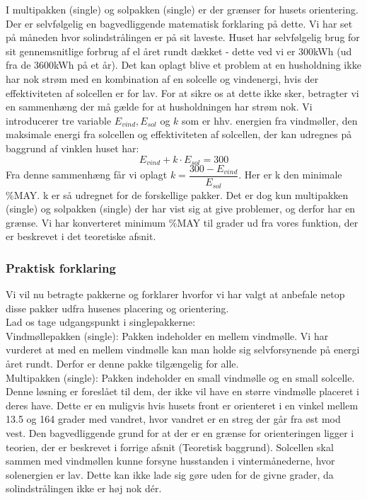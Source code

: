 \documentclass[12pt,a4paper]{article}
\theoremstyle{break}
\theoremstyle{nonumberplain}
\begin{document}
I multipakken (single) og solpakken (single) er der grænser for husets orientering. 
Der er selvfølgelig en bagvedliggende matematisk forklaring på dette. 
Vi har set på måneden hvor solindstrålingen er på sit laveste. Huset har selvfølgelig brug for sit gennemsnitlige forbrug af el året rundt dækket - dette ved vi er 300kWh (ud fra de 3600kWh på et år). 
Det kan oplagt blive et problem at en husholdning ikke har nok strøm med en kombination af en solcelle og vindenergi, hvis der effektiviteten af solcellen er for lav. 
For at sikre os at dette ikke sker, betragter vi en sammenhæng der må gælde for at husholdningen har strøm nok. Vi introducerer tre variable $E_{vind},E_{sol}$ og $k$ som er hhv. energien fra vindmøller, den maksimale energi fra solcellen og effektiviteten af solcellen, der kan udregnes på baggrund af vinklen huset har:
$$E_{vind}+k\cdot E_{sol} = 300$$
Fra denne sammenhæng får vi oplagt
$k = \dfrac{300-E_{vind}}{E_{sol}}$. 
Her er k den minimale \%MAY. k er så udregnet for de forskellige pakker. Det er dog kun multipakken (single) og solpakken (single) der har vist sig at give problemer, og derfor har en grænse. Vi har konverteret minimum \%MAY til grader ud fra vores funktion, der er beskrevet i det teoretiske afsnit.

\subsubsection{Praktisk forklaring}
Vi vil nu betragte pakkerne og forklarer hvorfor vi har valgt at anbefale netop disse pakker udfra husenes placering og orientering. 
\\
Lad os tage udgangspunkt i singlepakkerne:
\\

Vindmøllepakken (single): Pakken indeholder en mellem vindmølle. Vi har vurderet at med en mellem vindmølle kan man holde sig selvforsynende på energi året rundt. Derfor er denne pakke tilgængelig for alle. 
\\

Multipakken (single): Pakken indeholder en small vindmølle og en small solcelle. Denne løsning er foreslået til dem, der ikke vil have en større vindmølle placeret i deres have. Dette er en muligvis hvis husets front er orienteret i en vinkel mellem 13.5 og 164 grader med vandret, hvor vandret er en streg der går fra øst mod vest. Den bagvedliggende grund for at der er en grænse for orienteringen ligger i teorien, der er beskrevet i forrige afsnit (Teoretisk baggrund). Solcellen skal sammen med vindmøllen kunne forsyne husstanden i vintermånederne, hvor solenergien er lav. Dette kan ikke lade sig gøre uden for de givne grader, da solindstrålingen ikke er høj nok dér. 
\\
\end{document}
